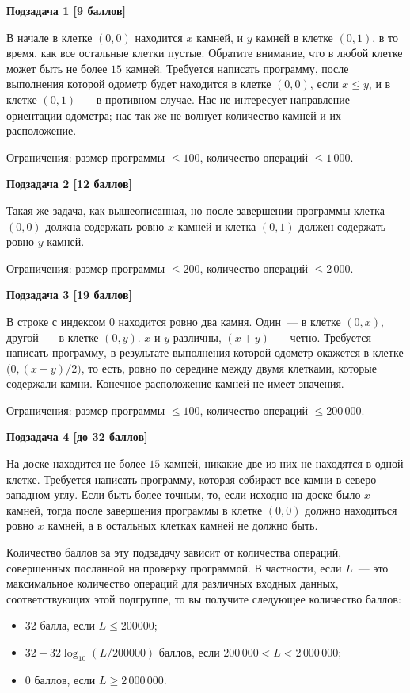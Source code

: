 \textbf{Подзадача 1 [9 баллов]}

В начале в клетке $(0, 0)$ находится $x$ камней, и $y$ камней в клетке $(0, 1)$, в то время, как все
остальные клетки пустые. Обратите внимание, что в любой клетке может быть не более $15$
камней. Требуется написать программу, после выполнения которой одометр будет
находится в клетке $(0, 0)$, если $x \le y$, и в клетке $(0, 1)$~--- в противном случае. Нас не
интересует направление ориентации одометра; нас так же не волнует количество камней
и их расположение.

Ограничения: размер программы $\le 100$, количество операций $\le 1\,000$.


\textbf{Подзадача 2 [12 баллов]}

Такая же задача, как вышеописанная, но после завершении программы клетка $(0, 0)$
должна содержать ровно $x$ камней и клетка $(0, 1)$ должен содержать ровно $y$ камней.

Ограничения: размер программы $\le 200$, количество операций $\le 2\,000$.



\textbf{Подзадача 3 [19 баллов]}

В строке с индексом $0$ находится ровно два камня. Один~--- в клетке $(0, x)$, другой~--- в клетке
$(0,y)$. $x$ и $y$ различны, $(x + y)$~--- четно. Требуется написать программу, в результате
выполнения которой одометр окажется в клетке ($0, (x + y) / 2)$, то есть, ровно по середине
между двумя клетками, которые содержали камни. Конечное расположение камней не
имеет значения.

Ограничения: размер программы $\le 100$, количество операций $\le 200\,000$.


\textbf{Подзадача 4 [до 32 баллов]}

На доске находится не более $15$ камней, никакие две из них не находятся в одной клетке.
Требуется написать программу, которая собирает все камни в северо-западном углу. Если
быть более точным, то, если исходно на доске было $x$ камней, тогда после завершения
программы в клетке $(0, 0)$ должно находиться ровно $x$ камней, а в остальных клетках
камней не должно быть.

Количество баллов за эту подзадачу зависит от количества операций, совершенных
посланной на проверку программой. В частности, если $L$~--- это максимальное количество
операций для различных входных данных, соответствующих этой подгруппе, то вы
получите следующее количество баллов:
\begin{itemize}
\item $32$ балла, если $L \le 200 000$;
\item $32 - 32 \log_{10} (L / 200 000)$ баллов, если $200\,000 < L < 2\,000\,000$;
\item $0$ баллов, если $L \ge 2\,000\,000$.
\end{itemize}

